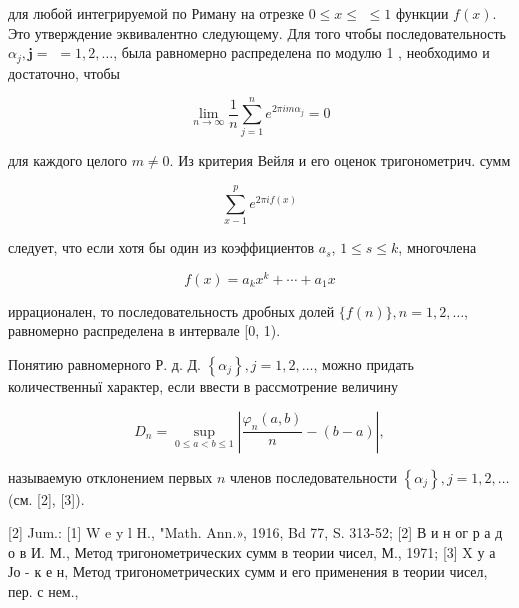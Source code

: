 \documentclass[10pt]{article}
\begin{document}
для любой интегрируемой по Риману на отрезке $0 \leqslant x \leqslant$ $\leqslant 1$ функции $f(x)$. Это утверждение эквивалентно следующему. Для того чтобы последовательность $\alpha_{j}, \boldsymbol{j}=$ $=1,2, \ldots$, была равномерно распределена по модулю 1 , необходимо и достаточно, чтобы



\[

\lim _{n \rightarrow \infty} \frac{1}{n} \sum_{j=1}^{n} e^{2 \pi i m \alpha_{j}}=0

\]



для каждого целого $m \neq 0$. Из критерия Вейля и его оценок тригонометрич. сумм



\[

\sum_{x-1}^{p} e^{2 \pi i f(x)}

\]



следует, что если хотя бы один из коэффициентов $a_{s}$, $1 \leqslant s \leqslant k$, многочлена



\[

f(x)=a_{k} x^{k}+\cdots+a_{1} x

\]



иррационален, то последовательность дробных долей $\{f(n)\}, n=1,2, \ldots$, равномерно распределена в интервале [0, 1).



Понятию равномерного Р. д. Д. $\left\{\alpha_{j}\right\}, j=1,2, \ldots$, можно придать количественныї характер, если ввести в рассмотрение величину



\[

D_{n}=\sup _{0 \leqslant a<b \leqslant 1}\left|\frac{\varphi_{n}(a, b)}{n}-(b-a)\right|,

\]



называемую отклонением первых $n$ членов последовательности $\left\{\alpha_{j}\right\}, j=1,2, \ldots$ (см. [2], [3]).



[2] Jum.: [1] W e y l H., "Math. Ann.», 1916, Bd 77, S. 313-52; [2] В и н ог р а д о в И. М., Метод тригонометрических сумм в теории чисел, М., 1971; [3] X у а Јо - к е н, Метод тригонометрических сумм и его применения в теории чисел, пер. с нем.,
\end{document}
